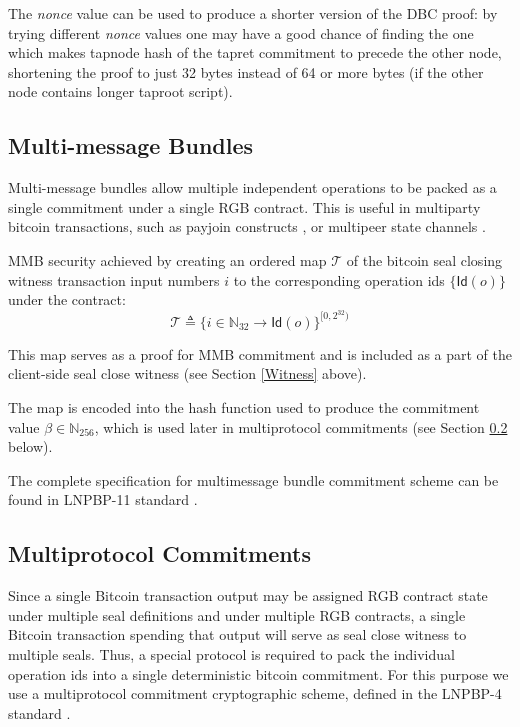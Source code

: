 \documentclass[9pt,oneside]{amsart}
\begin{document}
\begin{multicols}{2}
The \emph{nonce} value can be used to produce a shorter version of the DBC proof:
by trying different \emph{nonce} values one may have a good chance of finding the one
which makes tapnode hash of the tapret commitment to precede the other node,
shortening the proof to just 32 bytes instead of 64 or more bytes
(if the other node contains longer taproot script).


\subsection{Multi-message Bundles}\label{MMB}

Multi-message bundles allow multiple independent operations
to be packed as a single commitment under a single RGB contract.
This is useful in multiparty bitcoin transactions,
such as payjoin constructs \cite{payjoin}, or multipeer state channels \cite{nucleus}.

MMB security achieved by creating an ordered map $\mathcal{T}$ of
the bitcoin seal closing witness transaction input numbers $i$
to the corresponding operation ids $\{ \mathsf{Id}(o) \}$ under the contract:
\noindent
\begin{equation}
    \mathcal{T} \triangleq \{ i \in \mathbb{N}_{32} \rightarrow \mathsf{Id}(o) \}^{[0, 2^{32})}
\end{equation}

This map serves as a proof for MMB commitment and is included as a part of the
client-side seal close witness (see Section \ref{Witness} above).

The map is encoded into the hash function
used to produce the commitment value $\beta \in \mathbb{N}_{256}$,
which is used later in multiprotocol commitments (see Section \ref{MPC} below).

The complete specification for multimessage bundle commitment scheme
can be found in LNPBP-11 standard \cite{LNPBP11}.

\subsection{Multiprotocol Commitments}\label{MPC}

Since a single Bitcoin transaction output may be assigned RGB contract state
under multiple seal definitions and under multiple RGB contracts,
a single Bitcoin transaction spending that output will serve as
\gls{seal close witness} to multiple seals.
Thus, a special protocol is required to pack the individual operation ids
into a single deterministic bitcoin commitment.
For this purpose we use a multiprotocol commitment cryptographic scheme,
defined in the LNPBP-4 standard \cite{LNPBP4}.


\end{multicols}
\end{document}
